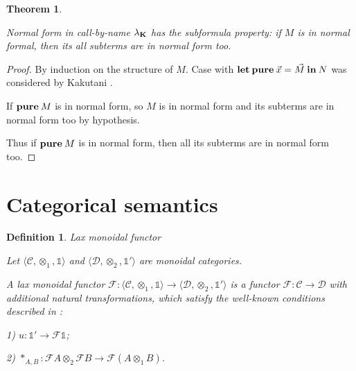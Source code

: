 \documentclass[a4paper]{article}
\newtheorem{theorem}{Theorem}
\newtheorem{defin}{Definition}
\begin{document}
\begin{theorem}
  $ $

  Normal form in call-by-name $\lambda_{{\bf K}}$ has the subformula property: if $M$ is in normal formal, then its all subterms are in normal form too.

\end{theorem}

\begin{proof}
  By induction on the structure of $M$.
  Case with ${\bf let \: pure\:} \vec{x} = \vec{M} {\: \bf in \:} N$ was considered by Kakutani \cite{ModalK} \cite{ModalK1}.

  If ${\bf pure \:} M$ is in normal form, so $M$ is in normal form and its subterms are in normal form too by hypothesis.

  Thus if ${\bf pure \:} M$ is in normal form, then all its subterms are in normal form too.
\end{proof}

\section{Categorical semantics}

\begin{defin} Lax monoidal functor

  Let $\langle \mathcal{C}, \otimes_1, \mathds{1} \rangle$ and $\langle \mathcal{D}, \otimes_2, \mathds{1}' \rangle$ are monoidal categories.

  A lax monoidal functor $\mathcal{F} : \langle \mathcal{C}, \otimes_1, \mathds{1} \rangle \to \langle \mathcal{D}, \otimes_2, \mathds{1}' \rangle$ is a functor
  $\mathcal{F} : \mathcal{C} \to \mathcal{D}$ with additional natural transformations, which satisfy the well-known conditions described in \cite{ElKelly}:

  1) $u : \mathds{1}' \to \mathcal{F}\mathds{1}$;

  2) $\ast_{A, B} : \mathcal{F}A \otimes_2 \mathcal{F}B \to \mathcal{F}(A \otimes_1 B)$.

\end{defin}
\end{document}
